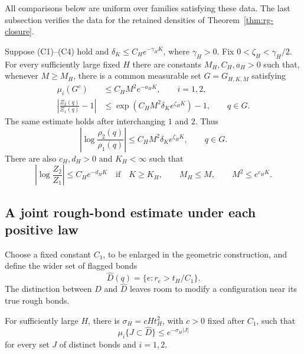 All comparisons below are uniform over families satisfying these data.
The last subsection verifies the data for the retained densities of
Theorem~\ref{thm:rg-closure}.

\begin{theorem}
\label{thm:relative-comparison}
Suppose \textup{(C1)--(C4)} hold and
\(\delta_K\le C_H e^{-\gamma_H K}\), where \(\gamma_H>0\).
Fix \(0<\zeta_H<\gamma_H/2\).  For every sufficiently large fixed \(H\)
there are constants \(M_H,C_H,a_H>0\) such that, whenever \(M\ge M_H\),
there is a common measurable set \(G=G_{H,K,M}\) satisfying
\begin{align}
 \mu_i(G^c)&\le C_HM^2e^{-a_HK},\qquad i=1,2,
                    \label{cmp:bad-probability}\\
 \left|\frac{\Xi_2(q)}{\Xi_1(q)}-1\right|
   &\le \exp\!\left(C_HM^2\delta_K e^{\zeta_HK}\right)-1,
                       \qquad q\in G. \label{cmp:relative-cover}
\end{align}
The same estimate holds after interchanging \(1\) and \(2\).  Thus
\begin{equation}
 \left|\log\frac{\rho_2(q)}{\rho_1(q)}\right|
       \le C_HM^2\delta_K e^{\zeta_HK},\qquad q\in G.
 \label{cmp:relative-density}
\end{equation}
There are also \(c_H,d_H>0\) and \(K_H<\infty\) such that
\begin{equation}
 \left|\log\frac{Z_2}{Z_1}\right|\le C_He^{-d_HK}
 \quad\text{if}\quad
 K\ge K_H,\qquad M_H\le M,\qquad M^2\le e^{c_HK}.
 \label{cmp:partition-conclusion}
\end{equation}
\end{theorem}

\subsection{A joint rough-bond estimate under each positive law}

Choose a fixed constant \(C_1\), to be enlarged in the geometric
construction, and define the wider set of flagged bonds
\begin{equation}
 \widehat D(q)=\{e:r_e>t_H/C_1\}.
 \label{cmp:wider-flags}
\end{equation}
The distinction between \(D\) and \(\widehat D\) leaves room to modify a
configuration near its true rough bonds.

\begin{lemma}
\label{cmp:rarity}
For sufficiently large \(H\), there is
\(\sigma_H=cHt_H^2\), with \(c>0\) fixed after \(C_1\), such that
\begin{equation}
 \mu_i\{J\subset\widehat D\}\le e^{-\sigma_H|J|}
 \label{cmp:joint-rarity}
\end{equation}
for every set \(J\) of distinct bonds and \(i=1,2\).
\end{lemma}

